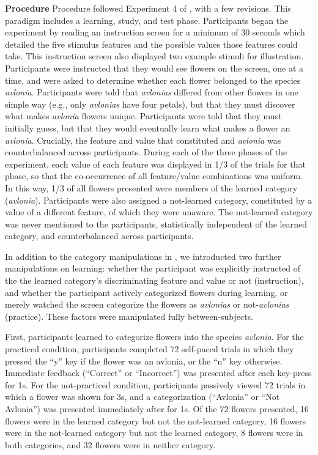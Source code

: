 \documentclass[twocolumn]{svjour3}          %
\begin{document}
\noindent\textbf{Procedure }
Procedure followed Experiment 4 of \citet{DeBrigard2017}, with a few
revisions. This paradigm includes a learning, study, and test
phase. Participants began the experiment by reading an instruction
screen for a minimum of 30 seconds which detailed the five stimulus
features and the possible values those features could take. This
instruction screen also displayed two example stimuli for
illustration. Participants were instructed that they would see flowers
on the screen, one at a time, and were asked to determine whether each
flower belonged to the species \emph{avlonia}.  Participants were told
that \emph{avlonias} differed from other flowers in one simple way
(e.g., only \emph{avlonias} have four petals), but that they must
discover what makes \emph{avlonia} flowers unique. Participants were
told that they must initially guess, but that they would eventually
learn what makes a flower an \emph{avlonia}. Crucially, the feature
and value that constituted and \emph{avlonia} was counterbalanced
across participants. During each of the three phases of the
experiment, each value of each feature was displayed in 1/3 of the
trials for that phase, so that the co-occurrence of all feature/value
combinations was uniform. In this way, 1/3 of all flowers presented
were members of the learned category (\emph{avlonia}). Participants
were also assigned a not-learned category, constituted by a value of a
different feature, of which they were unaware. The not-learned
category was never mentioned to the participants, statistically
independent of the learned category, and counterbalanced across
participants.

In addition to the category manipulations in \citet{DeBrigard2017}, we
introducted two further manipulations on learning: whether the
participant was explicitly instructed of the the learned category's
discriminating feature and value or not (instruction), and whether the
participant actively categorized flowers during learning, or merely
watched the screen categorize the flowers as \emph{avlonias} or
not-\emph{avlonias} (practice). These factors were manipulated fully
between-subjects.

First, participants learned to categorize flowers into the species
\emph{avlonia}. For the practiced condition, participants completed 72
self-paced trials in which they pressed the ``y'' key if the flower
was an avlonia, or the ``n'' key otherwise. Immediate feedback
(``Correct'' or ``Incorrect'') was presented after each key-press for
1s. For the not-practiced condition, participants passively viewed 72
trials in which a flower was shown for 3s, and a categorization
(``Avlonia'' or ``Not Avlonia'') was presented immediately after for
1s. Of the 72 flowers presented, 16 flowers were in the learned
category but not the not-learned category, 16 flowers were in the
not-learned category but not the learned category, 8 flowers were in
both categories, and 32 flowers were in neither category.
\end{document}
